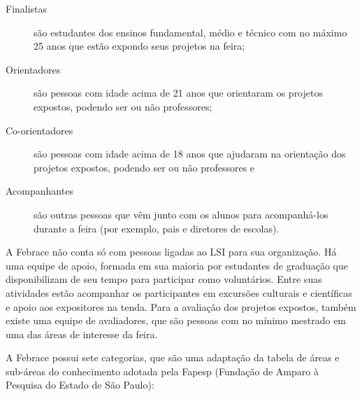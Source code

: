 \begin{description}
    \item[Finalistas] 
        são estudantes dos ensinos fundamental, médio e técnico com no máximo 25 anos que estão expondo seus projetos na feira;
    \item[Orientadores] 
        são pessoas com idade acima de 21 anos que orientaram os projetos expostos, podendo ser ou não professores;
    \item[Co-orientadores] 
        são pessoas com idade acima de 18 anos que ajudaram na orientação dos projetos expostos, podendo ser ou não professores e
    \item[Acompanhantes] 
        são outras pessoas que vêm junto com os alunos para acompanhá-los durante a feira (por exemplo, pais e diretores de escolas).
\end{description}

A Febrace não conta só com pessoas ligadas ao LSI para sua organização. Há uma equipe de apoio, formada em sua maioria por estudantes de graduação que disponibilizam de seu tempo para participar como voluntários. Entre suas atividades estão acompanhar os participantes em excursões culturais e científicas e apoio aos expositores na tenda. Para a avaliação dos projetos expostos, também existe uma equipe de avaliadores, que são pessoas com no mínimo mestrado em uma das áreas de interesse da feira.

A Febrace possui sete categorias, que são uma adaptação da tabela de áreas e sub-áreas do conhecimento adotada pela Fapesp (Fundação de Amparo à Pesquisa do Estado de São Paulo):

